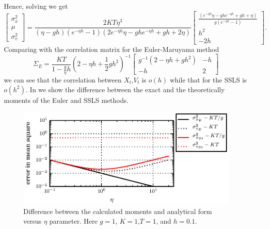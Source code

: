 Hence, solving we get
\begin{equation}
	\begin{bmatrix}
		\sigma_x^2\\
		\mu\\
		\sigma_v^2
	\end{bmatrix}
	=
	\frac{2 K T  \eta^3}
	{
		\left( \eta-g h \right)
		\left(e^{-\eta h}-1 \right) 
		\left( 
			2 e^{-\eta h}\eta
			-gh e^{-\eta h}
			+gh
			+2 \eta
		\right)
	}
	\begin {bmatrix}
		\frac{
			\left(
			 e^{-\eta h}\eta
				-gh e^{-\eta h}
				+gh
				+\eta 
			\right)
		}{
			g ( e^{-\eta h}-1)
		}\\ 
		h^2\\ 
		-2h
	\end {bmatrix}.
\end{equation}
Comparing with the correlation matrix for the Euler-Maruyama method 
\begin{equation}
	\Sigma_E = 
	\frac{KT}{1-\frac{g}{\eta}h}
	\left(
		2-\eta h +\frac{1}{2} g h^2
	\right)^{-1}
	\begin{bmatrix}
		g^{-1}(2-\eta h +g h^2) & -h\\
		-h &	2
	\end{bmatrix}
\end{equation}
we can see that the correlation between $X_t$,$ V_t$ is ${o}(h)$ while that for the SSLS is 
$o(h^2)$. In  we show the difference between the exact and the theoretically 
moments of the Euler and SSLS methods.
\begin{figure}[htb]
	\centering
	\includegraphics{./papers/paperB/figures/ErrorVariances.eps}
	\caption{Difference between the calculated moments and analytical form versus $\eta$ parameter. Here
	$g=1$, $K = 1$,$T = 1$, and $h =\num{0.1}$.}
	\label{fig:MeanSquareEta}
\end{figure}
